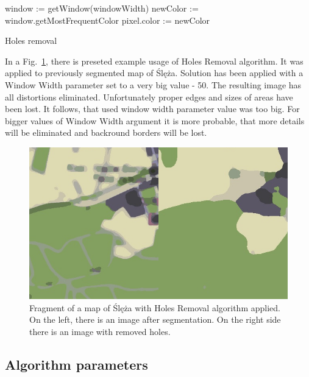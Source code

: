 \documentclass[a4paper,onecolumn,oneside,12pt]{memoir}
\begin{document}
\begin{algorithm}[!ht]

  {
    window := getWindow(windowWidth)\;
    newColor := window.getMostFrequentColor\;
    pixel.color := newColor\;
  }


  \caption{Holes removal}
  \label{holesRemovalAlgorithm}
\end{algorithm}

In a Fig.~\ref{holeRemovalResult}, there is preseted example usage of Holes Removal algorithm. It
was applied to previously segmented map of Ślęża. Solution has been applied with a Window Width
parameter set to a very big value - 50. The resulting image has all distortions eliminated.
Unfortunately proper edges and sizes of areas have been lost. It follows, that used window width
parameter value was too big. For bigger values of Window Width argument it is more probable, that
more details will be eliminated and backround borders will be lost.

\begin{figure}[!ht]
\begin{center}
\includegraphics[scale=0.5]{images/holeRemovalResult.png}
\caption{Fragment of a map of Ślęża with Holes Removal algorithm applied.
On the left, there is an image after segmentation. On the right side there is an image with removed
holes.}
\label{holeRemovalResult}
\end{center}
\end{figure}

\subsection{Algorithm parameters}
\label{backgroundDetectionParamsSection}
\end{document}
